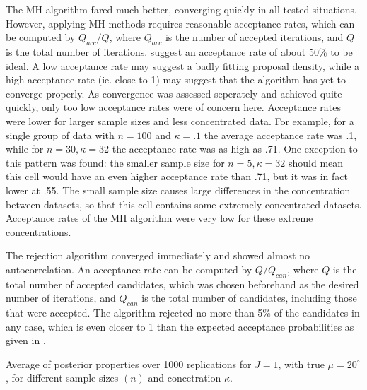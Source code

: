 \documentclass[bib]{ba/ba}
\begin{document}
The MH algorithm fared much better, converging quickly in all tested situations. However, applying MH methods requires reasonable acceptance rates, which can be computed by $Q_{acc}/Q$, where $Q_{acc}$ is the number of accepted iterations, and $Q$ is the total number of iterations. \citet{johnson1999ordinal} suggest an acceptance rate of about 50\% to be ideal. A low acceptance rate may suggest a badly fitting proposal density, while a high acceptance rate (ie. close to 1) may suggest that the algorithm has yet to converge properly. As convergence was assessed seperately and achieved quite quickly, only too low acceptance rates were of concern here. Acceptance rates were lower for larger sample sizes and less concentrated data. For example, for a single group of data with $n=100$ and $ \kappa=.1$ the average acceptance rate was .1, while for $n=30, \kappa=32$ the acceptance rate was as high as .71. One exception to this pattern was found: the smaller sample size for $n=5, \kappa=32$ should mean this cell would have an even higher acceptance rate than .71, but it was in fact lower at .55. The small sample size causes large differences in the concentration between datasets, so that this cell contains some extremely concentrated datasets. Acceptance rates of the MH algorithm were very low for these extreme concentrations. 

The rejection algorithm converged immediately and showed almost no autocorrelation. An acceptance rate can be computed by $Q/Q_{can}$, where $Q$ is the total number of accepted candidates, which was chosen beforehand as the desired number of iterations, and $Q_{can}$ is the total number of candidates, including those that were accepted. The algorithm rejected no more than 5\% of the candidates in any case, which is even closer to 1 than the expected acceptance probabilities as given in \citet{forbes2014fast}. 

\renewcommand{\footnoterule}{%
  \kern -3pt
  \hrule width \textwidth height 0pt
  \kern 2pt
}

\begin{table}
\begin{center}
\begin{minipage}{0.86\textwidth}
\caption{Average of posterior properties over 1000 replications for $J=1$, with true $\mu = 20^\circ$, for different sample sizes $(n)$ and concetration $\kappa$.}
\label{J1}

\vspace{-0.3cm}
\end{minipage}
\end{center}
\end{table}
\end{document}
